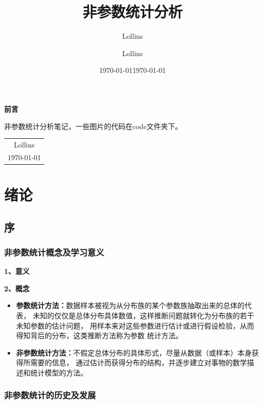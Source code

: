 \documentclass[lang=cn,10pt]{elegantbook}
\author{Lollins}
\date{\today}
\begin{document}
\title{非参数统计分析}
\author{Lollins}
\date{\today}

\maketitle

\setcounter{page}{1}

\begin{center}
    \Huge\textbf{前言}
\end{center}
\par
非参数统计分析笔记，一些图片的代码在code文件夹下。


\begin{flushright}
    \begin{tabular}{c}
        Lollins \\
        \today
    \end{tabular}
\end{flushright}

\newpage
{}
\setcounter{page}{1}
\tableofcontents
\newpage
\setcounter{page}{1}

\chapter{绪论}
\section{序}
\subsection{非参数统计概念及学习意义}
\textbf{1、意义}

\textbf{2、概念}
\begin{itemize}
    \item \textbf{参数统计方法：}数据样本被视为从分布族的某个参数族抽取出来的总体的代表，
          未知的仅仅是总体分布具体数值，这样推断问题就转化为分布族的若干未知参数的估计问题，
          用样本来对这些参数进行估计或进行假设检验，从而得知背后的分布，这类推断方法称为参数
          统计方法。
    \item \textbf{非参数统计方法：}不假定总体分布的具体形式，尽量从数据（或样本）本身获得所需要的信息，
          通过估计而获得分布的结构，并逐步建立对事物的数学描述和统计模型的方法。
\end{itemize}

\subsection{非参数统计的历史及发展}
\end{document}
